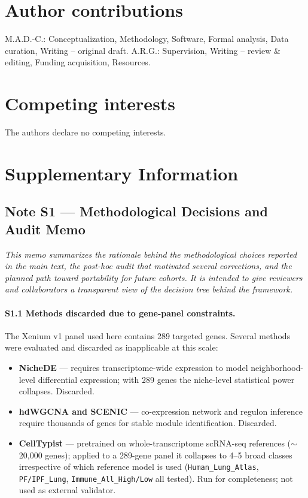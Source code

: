\documentclass[12pt,a4paper]{article}
\begin{document}
\section*{Author contributions}
M.A.D.-C.: Conceptualization, Methodology, Software, Formal analysis, Data curation, Writing -- original draft. A.R.G.: Supervision, Writing -- review \& editing, Funding acquisition, Resources.

\section*{Competing interests}
The authors declare no competing interests.




\newpage
\setcounter{section}{0}
\renewcommand{\thesection}{S\arabic{section}}
\renewcommand{\thefigure}{S\arabic{figure}}
\setcounter{figure}{0}
\section*{Supplementary Information}

\subsection*{Note S1 --- Methodological Decisions and Audit Memo}

\noindent\textit{This memo summarizes the rationale behind the methodological choices reported in the main text, the post-hoc audit that motivated several corrections, and the planned path toward portability for future cohorts. It is intended to give reviewers and collaborators a transparent view of the decision tree behind the framework.}

\paragraph{S1.1 Methods discarded due to gene-panel constraints.}
The Xenium v1 panel used here contains 289 targeted genes. Several methods were evaluated and discarded as inapplicable at this scale:
\begin{itemize}
    \item \textbf{NicheDE} --- requires transcriptome-wide expression to model neighborhood-level differential expression; with 289 genes the niche-level statistical power collapses. Discarded.
    \item \textbf{hdWGCNA and SCENIC} --- co-expression network and regulon inference require thousands of genes for stable module identification. Discarded.
    \item \textbf{CellTypist} --- pretrained on whole-transcriptome scRNA-seq references ($\sim$20{,}000 genes); applied to a 289-gene panel it collapses to 4--5 broad classes irrespective of which reference model is used (\texttt{Human\_Lung\_Atlas}, \texttt{PF/IPF\_Lung}, \texttt{Immune\_All\_High/Low} all tested). Run for completeness; not used as external validator.
\end{itemize}
\end{document}
